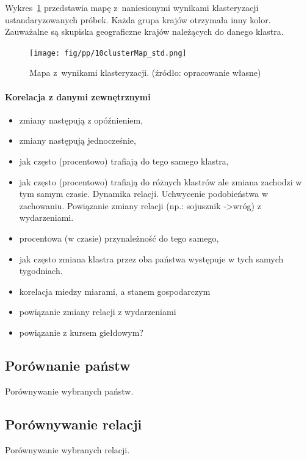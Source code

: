 \documentclass[11pt]{report}
\begin{document}
    Wykres~\ref{fig:clust10std} przedstawia mapę z~naniesionymi wynikami klasteryzacji ustandaryzowanych próbek.
    Każda grupa krajów otrzymała inny kolor.
    Zauważalne są skupiska geograficzne krajów należących do danego klastra.

    \begin{figure}[!htp]
        \centering
        \texttt{[image: fig/pp/10clusterMap\_std.png]}
        \caption{Mapa z~wynikami klasteryzacji. (źródło: opracowanie własne)}
        \label{fig:clust10std}
    \end{figure}

    \paragraph{Korelacja z danymi zewnętrznymi}
    \begin{itemize}
        \item zmiany następują z opóźnieniem,
        \item zmiany następują jednocześnie,
        \item jak często (procentowo) trafiają do tego samego klastra,
        \item jak często (procentowo) trafiają do różnych klastrów ale zmiana zachodzi w tym samym czasie.
        Dynamika relacji.
        Uchwycenie podobieństwa w zachowaniu.
        Powiązanie zmiany relacji (np.: sojusznik ->wróg) z wydarzeniami.
        \item procentowa (w czasie) przynależność do tego samego,
        \item jak często zmiana klastra przez oba państwa występuje w tych samych tygodniach.
        \item korelacja miedzy miarami, a stanem gospodarczym
        \item powiązanie zmiany relacji z wydarzeniami
        \item powiązanie z kursem giełdowym?
    \end{itemize}

    \subsection{Porównanie państw}
    Porównywanie wybranych państw.

    \subsection{Porównywanie relacji}
    Porównywanie wybranych relacji.
\end{document}
